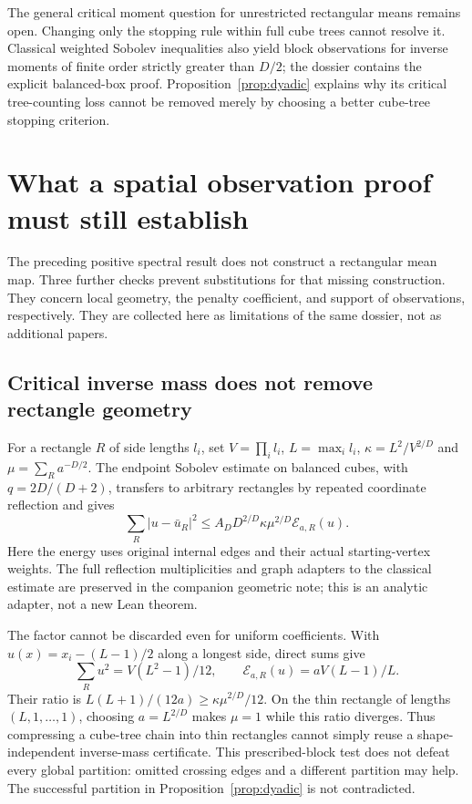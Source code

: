 \documentclass[11pt]{article}
\newcommand{\E}{\mathcal E}
\begin{document}
The general critical moment question for unrestricted rectangular means remains open.
Changing only the stopping rule within full cube trees cannot resolve it. Classical
weighted Sobolev inequalities \cite{ads} also yield block observations for inverse
moments of finite order strictly greater than $D/2$; the dossier contains the explicit
balanced-box proof. Proposition~\ref{prop:dyadic} explains why its critical tree-counting
loss cannot be removed merely by choosing a better cube-tree stopping criterion.

\section{What a spatial observation proof must still establish}
\label{sec:spatial-obstructions}
The preceding positive spectral result does not construct a rectangular mean map.
Three further checks prevent substitutions for that missing construction. They concern
local geometry, the penalty coefficient, and support of observations, respectively.
They are collected here as limitations of the same dossier, not as additional papers.

\subsection{Critical inverse mass does not remove rectangle geometry}
For a rectangle $R$ of side lengths $l_i$, set $V=\prod_i l_i$, $L=\max_i l_i$,
$\kappa=L^2/V^{2/D}$ and $\mu=\sum_R a^{-D/2}$. The endpoint Sobolev estimate
on balanced cubes, with $q=2D/(D+2)$, transfers to arbitrary rectangles by repeated
coordinate reflection and gives
\begin{equation}\label{eq:aspect}
 \sum_R|u-\bar u_R|^2\leq A_D D^{2/D}\kappa\mu^{2/D}\E_{a,R}(u).
\end{equation}
Here the energy uses original internal edges and their actual starting-vertex weights.
The full reflection multiplicities and graph adapters to the classical estimate
\cite[Section 2.2]{ads} are preserved in the companion geometric note; this is an
analytic adapter, not a new Lean theorem.

The factor cannot be discarded even for uniform coefficients. With $u(x)=x_i-(L-1)/2$
along a longest side, direct sums give
\[
 \sum_Ru^2=V(L^2-1)/12,\qquad
 \E_{a,R}(u)=aV(L-1)/L.
\]
Their ratio is $L(L+1)/(12a)\geq\kappa\mu^{2/D}/12$.
On the thin rectangle of lengths $(L,1,\ldots,1)$, choosing $a=L^{2/D}$ makes
$\mu=1$ while this ratio diverges. Thus compressing a cube-tree chain into thin
rectangles cannot simply reuse a shape-independent inverse-mass certificate.
This prescribed-block test does not defeat every global partition: omitted crossing
edges and a different partition may help. The successful partition in
Proposition~\ref{prop:dyadic} is not contradicted.
\end{document}
